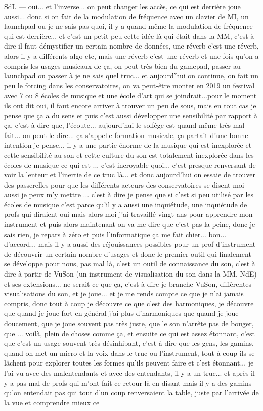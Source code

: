 SdL — oui... et l'inverse... on peut changer les accès, ce qui est derrière joue aussi... donc si on fait de la modulation de fréquence avec un clavier de MI, un launchpad ou je ne sais pas quoi, il y a quand même la modulation de fréquence qui est derrière... et c'est un petit peu cette idée là qui était dans la MM, c'est à dire il faut démystifier un certain nombre de données, une réverb c'est une réverb, alors il y a différents algo etc, mais une réverb c'est une réverb et une fois qu'on a compris les usages musicaux de ça, on peut très bien du gamepad, passer au launchpad ou passer à je ne sais quel truc... et aujourd'hui on continue, on fait un peu le forcing dans les conservatoires, on va peut-être monter en 2019 un festival avec 7 ou 8 écoles de musique et une école d'art qui se joindrait...pour le moment ils ont dit oui, il faut encore arriver à trouver un peu de sous, mais en tout cas je pense que ça a du sens et puis c'est aussi développer une sensibilité par rapport à ça, c'est à dire que, l'écoute... aujourd'hui le solfège est quand même très mal fait... on peut le dire... ça s'appelle formation musicale, ça partait d'une bonne intention je pense... il y a une partie énorme de la musique qui est inexplorée et cette sensibilité au son et cette culture du son est totalement inexplorée dans les écoles de musique ce qui est ... c'est incroyable quoi... c'est presque renversant de voir la lenteur et l'inertie de ce truc là... et donc aujourd'hui on essaie de trouver des passerelles pour que les différents acteurs des conservatoires se disent moi aussi je peux m'y mettre ... c'est à dire je pense que si c'est si peu utilisé par les écoles de musique c'est parce qu'il y a aussi une inquiétude, une inquiétude de profs qui diraient oui mais alors moi j'ai travaillé vingt ans pour apprendre mon instrument et puis alors maintenant on va me dire que c'est pas la peine, donc je sais rien, je repars à zéro et puis l'informatique ça me fait chier... bon... d'accord... mais il y a aussi des réjouissances possibles pour un prof d'instrument de découvrir un certain nombre d'usages et donc le premier outil qui finalement se développe pour nous, pas mal là, c'est un outil de connaissance du son, c'est à dire à partir de VuSon (un instrument de visualisation du son dans la MM, NdE) et ses extensions... ne serait-ce que ça, c'est à dire je branche VuSon, différentes visualisations du son, et je joue... et je me rends compte ce que je n'ai jamais compris, donc tout à coup je découvre ce que c'est des harmoniques, je découvre que quand je joue fort en général j'ai plus d'harmoniques que quand je joue doucement, que je joue souvent pas très juste, que le son n'arrête pas de bouger, que ... voilà, plein de choses comme ça, et ensuite ce qui est assez étonnant, c'est que c'est un usage souvent très désinhibant, c'est à dire que les gens, les gamins, quand on met un micro et la voix dans le truc ou l'instrument, tout à coup ils se lâchent pour explorer toutes les formes qu'ils peuvent faire et c'est étonnant... je l'ai vu avec des malentendants et avec des entendants, il y a un truc... et après il y a pas mal de profs qui m'ont fait ce retour là en disant mais il y a des gamins qu'on entendait pas qui tout d'un coup renversaient la table, juste par l'arrivée de la vue et comprendre mieux ce 